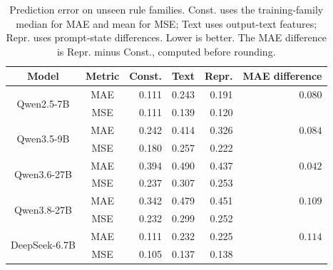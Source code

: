 \begin{table}[!htbp]
\centering
\caption{Prediction error on unseen rule families. Const. uses the training-family median for MAE and mean for MSE; Text uses output-text features; Repr. uses prompt-state differences. Lower is better. The MAE difference is Repr. minus Const., computed before rounding.}
\label{tab:representation-probe}
\small
\setlength{\tabcolsep}{3pt}
\begin{tabular}{ccrrrr}
\toprule
Model & Metric & Const. & Text & Repr. & MAE difference \\
\midrule
\multirow{2}{*}{Qwen2.5-7B} & MAE & 0.111 & 0.243 & 0.191 & $0.080$ \\
 & MSE & 0.111 & 0.139 & 0.120 &  \\
\multirow{2}{*}{Qwen3.5-9B} & MAE & 0.242 & 0.414 & 0.326 & $0.084$ \\
 & MSE & 0.180 & 0.257 & 0.222 &  \\
\multirow{2}{*}{Qwen3.6-27B} & MAE & 0.394 & 0.490 & 0.437 & $0.042$ \\
 & MSE & 0.237 & 0.307 & 0.253 &  \\
\multirow{2}{*}{Qwen3.8-27B} & MAE & 0.342 & 0.479 & 0.451 & $0.109$ \\
 & MSE & 0.232 & 0.299 & 0.252 &  \\
\multirow{2}{*}{DeepSeek-6.7B} & MAE & 0.111 & 0.232 & 0.225 & $0.114$ \\
 & MSE & 0.105 & 0.137 & 0.138 & \\
\bottomrule
\end{tabular}
\end{table}
